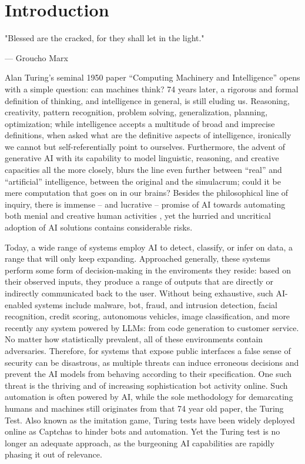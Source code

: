 \chapter{Introduction}\label{ch:introduction}

\epigraph{"Blessed are the cracked, for they shall let in the light."}{--- Groucho Marx}


Alan Turing's seminal 1950 paper ``Computing Machinery and Intelligence'' opens with a simple question: can machines think?
74 years later, a rigorous and formal definition of thinking, and intelligence in general, is still eluding us.
Reasoning, creativity, pattern recognition, problem solving, generalization, planning, optimization; while intelligence accepts a multitude of broad and imprecise definitions, when asked what are the definitive aspects of intelligence, ironically we cannot but self-referentially point to ourselves.
Furthermore, the advent of generative AI with its capability to model linguistic, reasoning, and creative capacities all the more closely, blurs the line even further between ``real'' and ``artificial'' intelligence, between the original and the simulacrum; could it be mere computation that goes on in our brains?
Besides the philosophical line of inquiry, there is immense -- and lucrative -- promise of \gls{AI} towards automating both menial and creative human activities \cite{benjamin1935work}, yet the hurried and uncritical adoption of \gls{AI} solutions contains considerable risks.

Today, a wide range of systems employ \gls{AI} to detect, classify, or infer on data, a range that will only keep expanding.
Approached generally, these systems perform some form of decision-making in the enviroments they reside: based on their observed inputs, they produce a range of outputs that are directly or indirectly communicated back to the user.
Without being exhaustive, such AI-enabled systems include malware, bot, fraud, and intrusion detection, facial recognition, credit scoring, autonomous vehicles, image classification, and more recently any system powered by LLMs: from code generation to customer service.
No matter how statistically prevalent, all of these environments contain adversaries.
Therefore, for systems that expose public interfaces a false sense of security can be disastrous, as multiple threats can induce erroneous decisions and prevent the \gls{AI} models from behaving according to their specification.
One such threat is the thriving and of increasing sophistication bot activity online.
Such automation is often powered by AI, while the sole methodology for demarcating humans and machines still originates from that 74 year old paper, the Turing Test.
Also known as the imitation game, Turing tests have been widely deployed online as Captchas to hinder bots and automation.
Yet the Turing test is no longer an adequate approach, as the burgeoning \gls{AI} capabilities are rapidly phasing it out of relevance.

